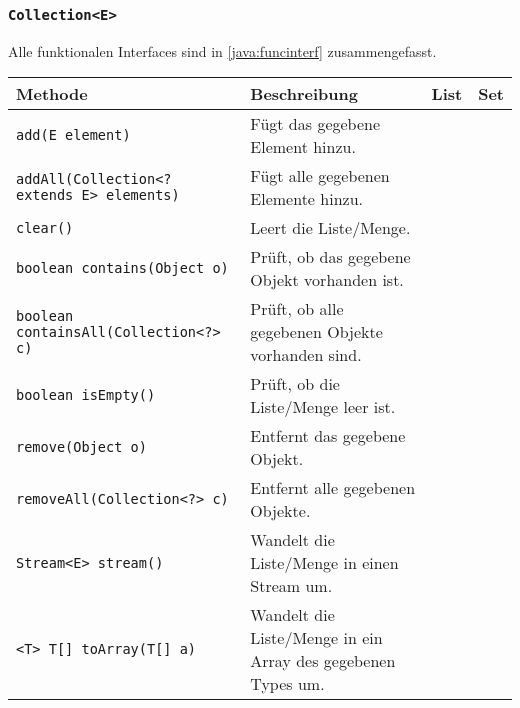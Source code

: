 \subsubsection{\texttt{Collection<E>}}
Alle funktionalen Interfaces sind in \ref{java:funcinterf} zusammengefasst.

\begin{sidewaystable}
	\centering
	\begin{tabular}{l | p{8cm} | c | c}
		Methode                                                      & Beschreibung                                                             & List       & Set        \\
		\hline
		\texttt{add(E element)}                                      & Fügt das gegebene Element hinzu.                                         & \texttimes & \texttimes \\
		\texttt{addAll(Collection<? extends E> elements)}            & Fügt alle gegebenen Elemente hinzu.                                      & \texttimes & \texttimes \\
		\texttt{clear()}                                             & Leert die Liste/Menge.                                                   & \texttimes & \texttimes \\
		\texttt{boolean contains(Object o)}                          & Prüft, ob das gegebene Objekt vorhanden ist.                             & \texttimes & \texttimes \\
		\texttt{boolean containsAll(Collection<?> c)}                & Prüft, ob alle gegebenen Objekte vorhanden sind.                         & \texttimes & \texttimes \\
		\texttt{boolean isEmpty()}                                   & Prüft, ob die Liste/Menge leer ist.                                      & \texttimes & \texttimes \\
		\texttt{remove(Object o)}                                    & Entfernt das gegebene Objekt.                                            & \texttimes & \texttimes \\
		\texttt{removeAll(Collection<?> c)}                          & Entfernt alle gegebenen Objekte.                                         & \texttimes & \texttimes \\
		\texttt{Stream<E> stream()}                                  & Wandelt die Liste/Menge in einen Stream um.                              & \texttimes & \texttimes \\
		\texttt{<T> T[] toArray(T[] a)}                              & Wandelt die Liste/Menge in ein Array des gegebenen Types um.             & \texttimes & \texttimes \\

\end{tabular}
\end{sidewaystable}
